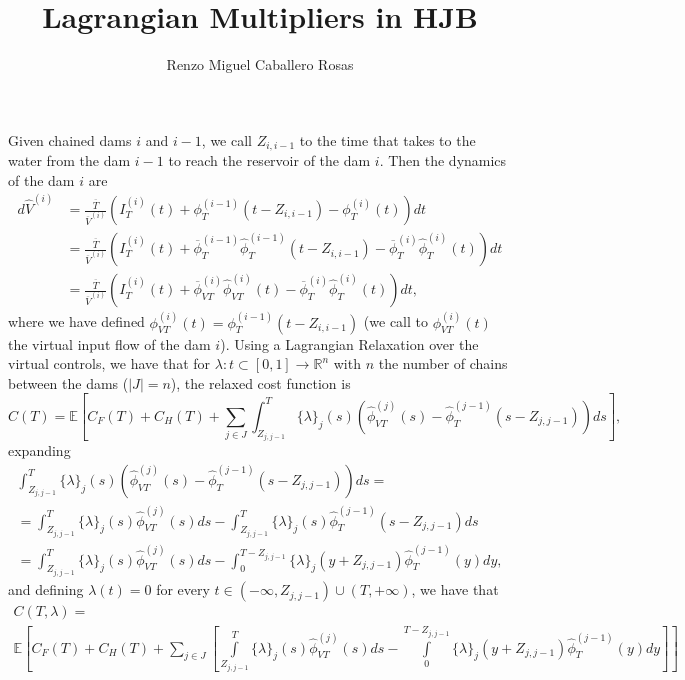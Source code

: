 \documentclass[12pt]{article}
\theoremstyle{definition}
\theoremstyle{remark}
\newcommand{\R}{\mathbb{R}}
\newcommand{\E}{\mathbb{E}}
\begin{document}
\title{Lagrangian Multipliers in HJB}
\author{Renzo Miguel Caballero Rosas} 
\maketitle

Given chained dams $i$ and $i-1$, we call $Z_{i,i-1}$ to the time that takes to the water from the dam $i-1$ to reach the reservoir of the dam $i$. Then the dynamics of the dam $i$ are
\begin{equation*}
\begin{split}
d\hat{V}^{(i)}&=\frac{\overline{T}}{\overline{V}^{(i)}}\left(I_T^{(i)}(t)+\phi_{T}^{(i-1)}(t-Z_{i,i-1})-\phi_T^{(i)}(t)\right)dt\\
&=\frac{\overline{T}}{\overline{V}^{(i)}}\left(I_T^{(i)}(t)+\overline{\phi}_{T}^{(i-1)}\hat{\phi}_{T}^{(i-1)}(t-Z_{i,i-1})-\overline{\phi}_T^{(i)}\hat{\phi}_T^{(i)}(t)\right)dt\\
&=\frac{\overline{T}}{\overline{V}^{(i)}}\left(I_T^{(i)}(t)+\overline{\phi}_{VT}^{(i)}\hat{\phi}_{VT}^{(i)}(t)-\overline{\phi}_T^{(i)}\hat{\phi}_T^{(i)}(t)\right)dt,
\end{split}
\end{equation*}
where we have defined $\phi_{VT}^{(i)}(t)=\phi_{T}^{(i-1)}(t-Z_{i,i-1})$ (we call to $\phi_{VT}^{(i)}(t)$ the virtual input flow of the dam $i$). 
Using a Lagrangian Relaxation over the virtual controls, we have that for $\lambda:t\subset[0,1]\to\R^n$ with $n$ the number of chains between the dams ($|J|=n$), the relaxed cost function is
\begin{equation*}
C(T)=\E\left[C_F(T)+C_H(T)+\sum_{j\in J}\int_{Z_{j,j-1}}^T\{\lambda\}_j(s)\left(\hat{\phi}_{VT}^{(j)}(s)-\hat{\phi}_{T}^{(j-1)}(s-Z_{j,j-1})\right)ds\right],
\end{equation*}
expanding
\begin{multline*}
\int_{Z_{j,j-1}}^T\{\lambda\}_j(s)\left(\hat{\phi}_{VT}^{(j)}(s)-\hat{\phi}_{T}^{(j-1)}(s-Z_{j,j-1})\right)ds=\\
=\int_{Z_{j,j-1}}^T\{\lambda\}_j(s)\hat{\phi}_{VT}^{(j)}(s)ds-\int_{Z_{j,j-1}}^T\{\lambda\}_j(s)\hat{\phi}_{T}^{(j-1)}(s-Z_{j,j-1})ds\\
=\int_{Z_{j,j-1}}^T\{\lambda\}_j(s)\hat{\phi}_{VT}^{(j)}(s)ds-\int_0^{T-Z_{j,j-1}}\{\lambda\}_j(y+Z_{j,j-1})\hat{\phi}_{T}^{(j-1)}(y)dy,
\end{multline*}
and defining $\lambda(t)=0$ for every $t\in(-\infty,Z_{j,j-1})\cup(T,+\infty)$, we have that
\begin{multline*}
C(T,\lambda)=\\
\E\left[C_F(T)+C_H(T)+\sum_{j\in J}\left[\int\limits_{Z_{j,j-1}}^T\{\lambda\}_j(s)\hat{\phi}_{VT}^{(j)}(s)ds-\int\limits_0^{T-Z_{j,j-1}}\{\lambda\}_j(y+Z_{j,j-1})\hat{\phi}_{T}^{(j-1)}(y)dy\right]\right]
\end{multline*}
\end{document}
